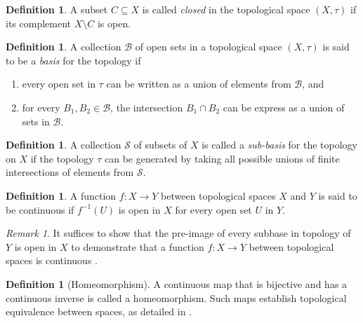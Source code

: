 \documentclass{amsart}
\theoremstyle{definition}
\newtheorem{definition}[theorem]{Definition}
\theoremstyle{remark}
\newtheorem{remark}[theorem]{Remark}
\numberwithin{equation}{section}
\begin{document}
	\begin{definition}\cite{Munkres}
		\label{Closed Sets}
		A subset \( C \subseteq X \) is called \textit{closed} in the topological
		space \( (X, \tau) \) if its complement \( X \setminus C \) is open.
	\end{definition}
	
	\begin{definition}\cite{Munkres}
		A collection \( \mathcal{B} \) of open sets in a topological space \( (X,
		\tau) \) is said to be a \textit{basis} for the topology if
		\begin{enumerate}
			\item every open set in \( \tau \)
			can be written as a union of elements from \( \mathcal{B} \), and
			\item for every \(B_1, B_2 \in \mathcal{B}\), the intersection
			\(B_1 \cap B_2\) can be express as a union of sets in \(\mathcal{B}\).
		\end{enumerate}
	\end{definition}
	
	\begin{definition}\cite{Munkres}
		A collection \( \mathcal{S} \) of subsets of \( X \) is called a
		\textit{sub-basis} for the topology on \( X \) if the topology \( \tau \)
		can be
		generated by taking all possible unions of finite intersections of
		elements from
		\( \mathcal{S} \).
	\end{definition}
	
	\begin{definition} \cite{Munkres}
		A function \(f:X \rightarrow Y\) between topological spaces \(X\) and \(Y\) is said to be continuous if \(f^{-1}(U)\) is open in \(X\) for every open set \(U\) in \(Y\).
	\end{definition}
	
	\begin{remark}
		\label{ContinuityviaSub-basis}
		It suffices to show that the pre-image of every subbase in topology of \( Y \) is open in \( X \) to demonstrate that a function \( f: X \rightarrow
		Y \) between topological spaces is continuous \cite{Munkres}.
	\end{remark}
	
	\begin{definition}[Homeomorphism]
		A continuous map that is bijective and has a continuous inverse is called
		a
		homeomorphism. Such maps establish topological equivalence between
		spaces, as
		detailed in \cite{Munkres}.
	\end{definition}
	
\end{document}

